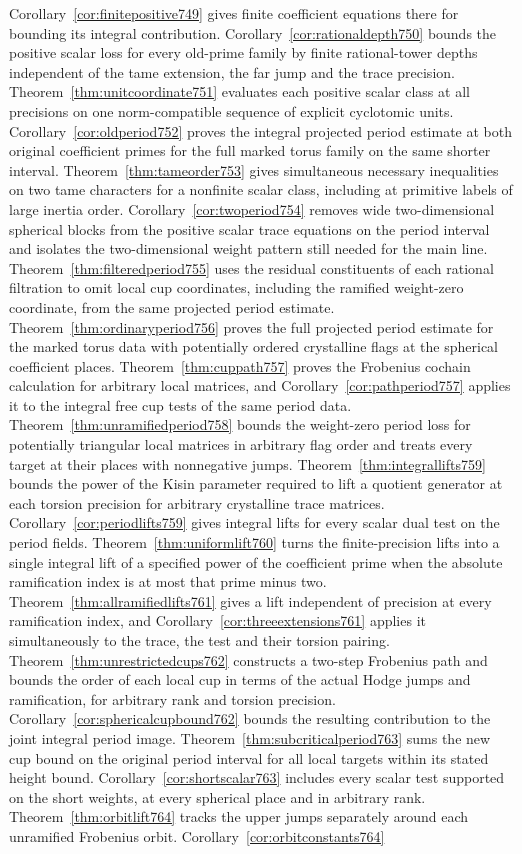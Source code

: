 \documentclass[a4paper,11pt]{article}
\theoremstyle{definition}
\theoremstyle{remark}
\numberwithin{equation}{section}
\begin{document}
Corollary~\ref{cor:finitepositive749} gives finite coefficient equations there for bounding its integral contribution. Corollary~\ref{cor:rationaldepth750} bounds the positive scalar loss for every old-prime family by finite rational-tower depths independent of the tame extension, the far jump and the trace precision. Theorem~\ref{thm:unitcoordinate751} evaluates each positive scalar class at all precisions on one norm-compatible sequence of explicit cyclotomic units. Corollary~\ref{cor:oldperiod752} proves the integral projected period estimate at both original coefficient primes for the full marked torus family on the same shorter interval. Theorem~\ref{thm:tameorder753} gives simultaneous necessary inequalities on two tame characters for a nonfinite scalar class, including at primitive labels of large inertia order. Corollary~\ref{cor:twoperiod754} removes wide two-dimensional spherical blocks from the positive scalar trace equations on the period interval and isolates the two-dimensional weight pattern still needed for the main line. Theorem~\ref{thm:filteredperiod755} uses the residual constituents of each rational filtration to omit local cup coordinates, including the ramified weight-zero coordinate, from the same projected period estimate. Theorem~\ref{thm:ordinaryperiod756} proves the full projected period estimate for the marked torus data with potentially ordered crystalline flags at the spherical coefficient places. Theorem~\ref{thm:cuppath757} proves the Frobenius cochain calculation for arbitrary local matrices, and Corollary~\ref{cor:pathperiod757} applies it to the integral free cup tests of the same period data. Theorem~\ref{thm:unramifiedperiod758} bounds the weight-zero period loss for potentially triangular local matrices in arbitrary flag order and treats every target at their places with nonnegative jumps. Theorem~\ref{thm:integrallifts759} bounds the power of the Kisin parameter required to lift a quotient generator at each torsion precision for arbitrary crystalline trace matrices. Corollary~\ref{cor:periodlifts759} gives integral lifts for every scalar dual test on the period fields. Theorem~\ref{thm:uniformlift760} turns the finite-precision lifts into a single integral lift of a specified power of the coefficient prime when the absolute ramification index is at most that prime minus two. Theorem~\ref{thm:allramifiedlifts761} gives a lift independent of precision at every ramification index, and Corollary~\ref{cor:threeextensions761} applies it simultaneously to the trace, the test and their torsion pairing. Theorem~\ref{thm:unrestrictedcups762} constructs a two-step Frobenius path and bounds the order of each local cup in terms of the actual Hodge jumps and ramification, for arbitrary rank and torsion precision. Corollary~\ref{cor:sphericalcupbound762} bounds the resulting contribution to the joint integral period image. Theorem~\ref{thm:subcriticalperiod763} sums the new cup bound on the original period interval for all local targets within its stated height bound. Corollary~\ref{cor:shortscalar763} includes every scalar test supported on the short weights, at every spherical place and in arbitrary rank. Theorem~\ref{thm:orbitlift764} tracks the upper jumps separately around each unramified Frobenius orbit. Corollary~\ref{cor:orbitconstants764} 
\end{document}
